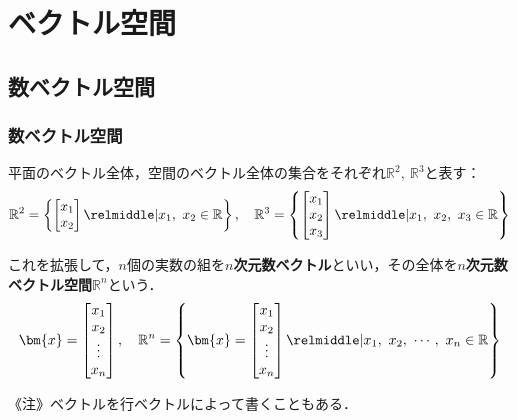 \chapter{ベクトル空間}
\setcounter{page}{1}



\section{数ベクトル空間}
\subsection{数ベクトル空間}

平面のベクトル全体，空間のベクトル全体の集合をそれぞれ$\mathbb{R}^2,\ \mathbb{R}^3$と表す：
\begin{equation}
	\mathbb{R}^2 =
	\left\{
		\begin{bmatrix}
			x_1\\ x_2
		\end{bmatrix}
		\relmiddle|
		x_1,\ x_2 \in \mathbb{R}
	\right\},\quad
	\mathbb{R}^3 =
	\left\{
		\begin{bmatrix}
			x_1\\ x_2\\ x_3
		\end{bmatrix}
		\relmiddle|
		x_1,\ x_2,\ x_3 \in \mathbb{R}
	\right\}
\end{equation}

これを拡張して，$n$個の実数の組を\textbf{$n$次元数ベクトル}といい，その全体を\textbf{$n$次元数ベクトル空間}$\mathbb{R}^n$という．
\begin{equation}
	\bm{x} =
	\begin{bmatrix}
		x_1\\ x_2\\ \vdots\\ x_n
	\end{bmatrix}
	,\quad \mathbb{R}^n =
	\left\{
		\bm{x} =
		\begin{bmatrix}
			x_1\\ x_2\\ \vdots\\ x_n
		\end{bmatrix}
		\relmiddle|
		x_1,\ x_2,\ \cdots,\ x_n \in \mathbb{R}
	\right\}
\end{equation}

《注》ベクトルを行ベクトルによって書くこともある．

